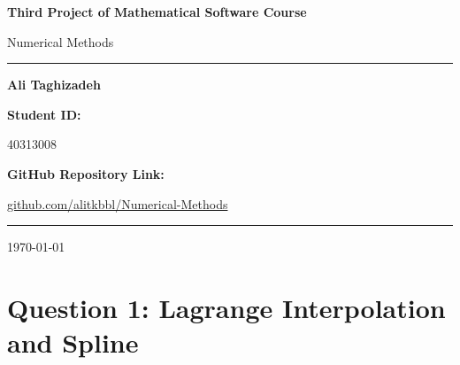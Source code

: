 \documentclass[12pt,a4paper]{article}
\begin{document}
	
	\begin{titlepage}
		\centering
		
		\vspace*{1cm}
		
		{\Huge\bfseries Third Project of Mathematical Software Course\par}
		\vspace{1.2cm}
		
		{\Large Numerical Methods\par}
		\vspace{2.3cm}
		
		\rule{0.75\textwidth}{0.8pt}\par
		\vspace{1cm}
		
		{\Large\bfseries Ali Taghizadeh\par}
		
		\vspace{1.2cm}
		
		{\large\bfseries Student ID:\par}
		\vspace{0.45cm}
		{\large 40313008\par}
		
		\vspace{0.8cm}
		
		\vspace{0.8cm}
		
		\vspace{0.8cm}
		
		{\large\bfseries GitHub Repository Link:\par}
		\vspace{0.35cm}
		{\large\href{https://github.com/alitkbbl/Numerical-Methods}{github.com/alitkbbl/Numerical-Methods}\par}
		
		\vfill
		
		\rule{0.75\textwidth}{0.8pt}\par
		\vspace{0.8cm}
		
		{\large \today\par}
		
	\end{titlepage}
	
	\newpage
	
	\section*{Question 1: Lagrange Interpolation and Spline}
	
\end{document}
